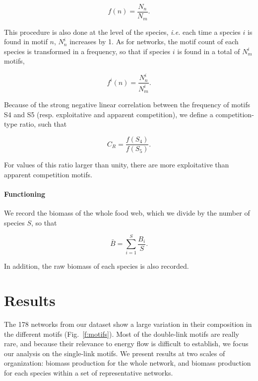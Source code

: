 \documentclass[12pt]{article}
\begin{document}
\begin{equation}
	f(n) = \frac{N_{n}}{N_{m}}.
\end{equation}

This procedure is also done at the level of the species, \emph{i.e.} each time a species $i$ is found in motif $n$, $N_{n}^{i}$ increases by 1. As for networks, the motif count of each species is transformed in a frequency, so that if species $i$ is found in a total of $N_{m}^{i}$ motifs,

\begin{equation}
	f^{i}(n) = \frac{N_{n}^{i}}{N_{m}^{i}}.
\end{equation}

Because of the strong negative linear correlation between the frequency of motifs S4 and S5 (resp. exploitative and apparent competition), we define a competition-type ratio, such that

\begin{equation}
	C_{R} = \frac{f(S_4)}{f(S_5)}.
\end{equation}

For values of this ratio larger than unity, there are more exploitative than apparent competition motifs.

\paragraph{Functioning} We record the biomass of the whole food web, which we divide by the number of species $S$, so that

\begin{equation}
	\bar B = \sum_{i=1}^{S}\frac{B_{i}}{S}.
\end{equation}

In addition, the raw biomass of each species is also recorded.

\section{Results}

The 178 networks from our dataset show a large variation in their composition in the different motifs (Fig.~\ref{f:motifs}). Most of the double-link motifs are really rare, and because their relevance to energy flow is difficult to establish, we focus our analysis on the single-link motifs. We present results at two scales of organization: biomass production for the whole network, and biomass production for each species within a set of representative networks.
\end{document}
